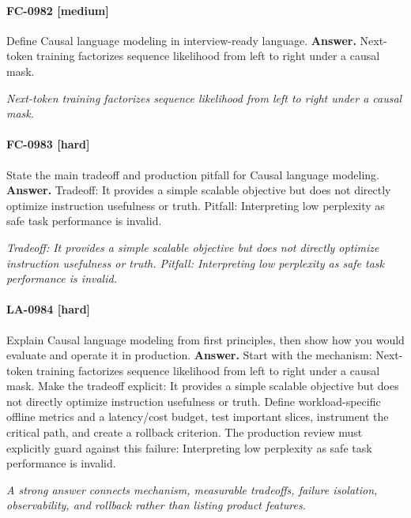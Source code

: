 \paragraph{FC-0982 [medium]} Define Causal language modeling in interview-ready language.
\noindent\textbf{Answer.} Next-token training factorizes sequence likelihood from left to right under a causal mask.
\par\textit{Next-token training factorizes sequence likelihood from left to right under a causal mask.}
\paragraph{FC-0983 [hard]} State the main tradeoff and production pitfall for Causal language modeling.
\noindent\textbf{Answer.} Tradeoff: It provides a simple scalable objective but does not directly optimize instruction usefulness or truth. Pitfall: Interpreting low perplexity as safe task performance is invalid.
\par\textit{Tradeoff: It provides a simple scalable objective but does not directly optimize instruction usefulness or truth. Pitfall: Interpreting low perplexity as safe task performance is invalid.}
\paragraph{LA-0984 [hard]} Explain Causal language modeling from first principles, then show how you would evaluate and operate it in production.
\noindent\textbf{Answer.} Start with the mechanism: Next-token training factorizes sequence likelihood from left to right under a causal mask. Make the tradeoff explicit: It provides a simple scalable objective but does not directly optimize instruction usefulness or truth. Define workload-specific offline metrics and a latency/cost budget, test important slices, instrument the critical path, and create a rollback criterion. The production review must explicitly guard against this failure: Interpreting low perplexity as safe task performance is invalid.
\par\textit{A strong answer connects mechanism, measurable tradeoffs, failure isolation, observability, and rollback rather than listing product features.}
